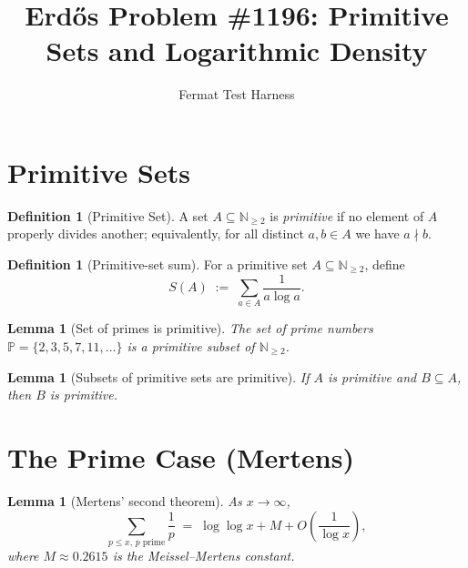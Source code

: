 \documentclass{article}
\title{Erdős Problem \#1196: Primitive Sets and Logarithmic Density}
\author{Fermat Test Harness}
\date{}
\newtheorem{lemma}[theorem]{Lemma}
\theoremstyle{definition}
\newtheorem{definition}[theorem]{Definition}
\begin{document}
\maketitle

\section{Primitive Sets}

\begin{definition}[Primitive Set]
\label{def:primitive}
A set $A \subseteq \mathbb{N}_{\geq 2}$ is \emph{primitive} if no element of
$A$ properly divides another; equivalently, for all distinct $a, b \in A$
we have $a \nmid b$.
\end{definition}

\begin{definition}[Primitive-set sum]
\label{def:sum-S}
For a primitive set $A \subseteq \mathbb{N}_{\geq 2}$, define
\[
  S(A) \;:=\; \sum_{a \in A} \frac{1}{a \log a}.
\]
\end{definition}

\begin{lemma}[Set of primes is primitive]
\label{lem:primes-primitive}
The set of prime numbers $\mathbb{P} = \{2, 3, 5, 7, 11, \ldots\}$
is a primitive subset of $\mathbb{N}_{\geq 2}$.
\end{lemma}

\begin{lemma}[Subsets of primitive sets are primitive]
\label{lem:subset-primitive}
If $A$ is primitive and $B \subseteq A$, then $B$ is primitive.
\end{lemma}

\section{The Prime Case (Mertens)}

\begin{lemma}[Mertens' second theorem]
\label{lem:mertens}
As $x \to \infty$,
\[
  \sum_{p \leq x,\, p \text{ prime}} \frac{1}{p} \;=\; \log \log x + M + O\!\left(\frac{1}{\log x}\right),
\]
where $M \approx 0.2615$ is the Meissel--Mertens constant.
\end{lemma}
\end{document}
